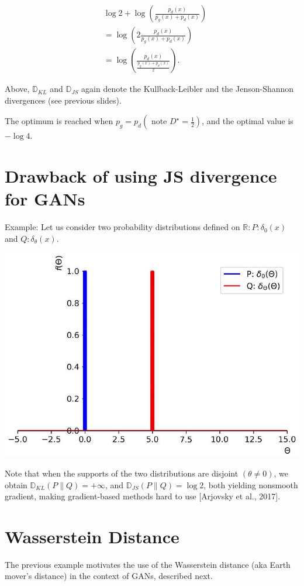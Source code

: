 \documentclass[10pt]{article}
\begin{document}
$$
\begin{aligned}
& \log 2+\log \left(\frac{p_{d}(x)}{p_{g}(x)+p_{d}(x)}\right) \\
& =\log \left(2 \frac{p_{d}(x)}{p_{g}(x)+p_{d}(x)}\right) \\
& =\log \left(\frac{p_{d}(x)}{\frac{p_{g}(x)+p_{d}(x)}{2}}\right) .
\end{aligned}
$$

Above, $\mathbb{D}_{K L}$ and $\mathbb{D}_{J S}$ again denote the Kullback-Leibler and the Jenson-Shannon divergences (see previous slides).

The optimum is reached when $p_{g}=p_{d}\left(\right.$ note $\left.D^{\star}=\frac{1}{2}\right)$, and the optimal value is $-\log 4$.

\section*{Drawback of using JS divergence for GANs}
Example: Let us consider two probability distributions defined on $\mathbb{R}: P: \delta_{0}(x)$ and $Q: \delta_{\theta}(x)$.

\begin{center}
\includegraphics[max width=\textwidth]{2024_01_08_a381fc3992661ee7020eg-25}
\end{center}

Note that when the supports of the two distributions are disjoint $(\theta \neq 0)$, we obtain $\mathbb{D}_{K L}(P \| Q)=+\infty$, and $\mathbb{D}_{J S}(P \| Q)=\log 2$, both yielding nonsmooth gradient, making gradient-based methods hard to use [Arjovsky et al., 2017].

\section*{Wasserstein Distance}
The previous example motivates the use of the Wasserstein distance (aka Earth mover's distance) in the context of GANs, described next.
\end{document}
